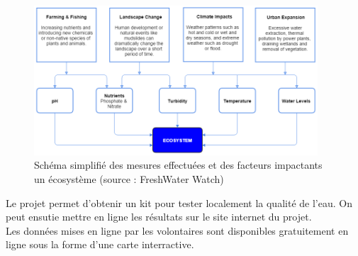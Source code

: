 \documentclass[10pt, article]{llncs}
\begin{document}
		\begin{figure}
			\begin{center}
				\includegraphics[width=300pt]{img/ecosystem-flowchart.png}
			\end{center}
			\caption{Schéma simplifié des mesures effectuées et des facteurs impactants un écosystème (source : FreshWater Watch)}
		\end{figure}
		Le projet permet d'obtenir un kit pour tester localement la qualité de l'eau. On peut ensutie mettre en ligne les résultats sur le site internet du projet.\\
		Les données mises en ligne par les volontaires sont disponibles gratuitement en ligne sous la forme d'une carte interractive.
		
\end{document}
